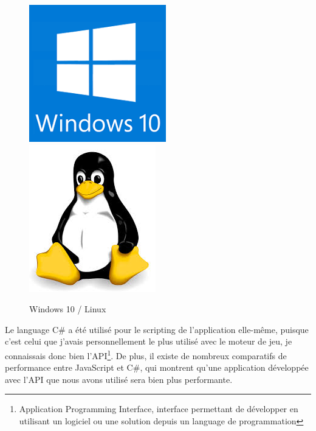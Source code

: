 \documentclass[a4paper]{article}
\begin{document}
    \begin{figure}[H]
        \centering
        \includegraphics[scale=0.5]{img/logo-w10}
        \hspace{10pt}
        \includegraphics[scale=0.5]{img/logo-linux}
        \caption{Windows 10 / Linux}
    \end{figure}
    
    Le language C\# a été utilisé pour le scripting de l'application elle-même, puisque c'est celui que j'avais personnellement le plus utilisé avec le moteur de jeu, je connaissais donc bien l'API\footnote{Application Programming Interface, interface permettant de développer en utilisant un logiciel ou une solution depuis un language de programmation}. De plus, il existe de nombreux comparatifs de performance entre JavaScript et C\#, qui montrent qu'une application développée avec l'API que nous avons utilisé sera bien plus performante. \\
\end{document}
